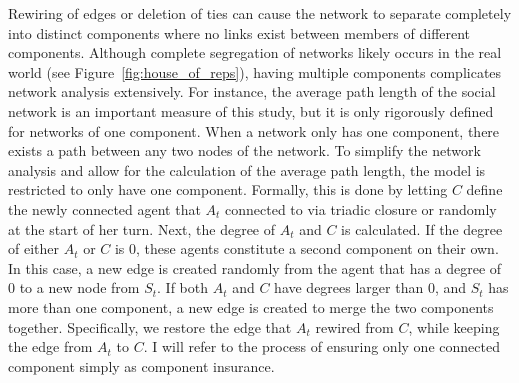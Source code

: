 \documentclass[11pt]{article}
\begin{document}
\noindent Rewiring of edges or deletion of ties can cause the network to separate completely into distinct components where no links exist between members of different components. Although complete segregation of networks likely occurs in the real world (see Figure~\ref{fig:house_of_reps}), having multiple components complicates network analysis extensively. For instance, the average path length of the social network is an important measure of this study, but it is only rigorously defined for networks of one component. When a network only has one component, there exists a path between any two nodes of the network. To simplify the network analysis and allow for the calculation of the average path length, the model is restricted to only have one component. Formally, this is done by letting $C$ define the newly connected agent that $A_t$ connected to via triadic closure or randomly at the start of her turn. Next, the degree of $A_t$ and $C$ is calculated. If the degree of either $A_t$ or $C$ is 0, these agents constitute a second component on their own. In this case, a new edge is created randomly from the agent that has a degree of 0 to a new node from $S_t$.
If both $A_t$ and $C$ have degrees larger than 0, and $S_t$ has more than one component, a new edge is created to merge the two components together. Specifically, we restore the edge that $A_t$ rewired from $C$, while keeping the edge from $A_t$ to $C$.
I will refer to the process of ensuring only one connected component simply as component insurance. 
\end{document}
